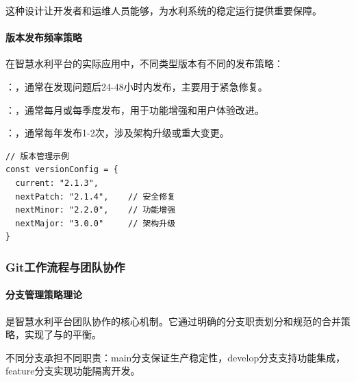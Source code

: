 这种设计让开发者和运维人员能够，为水利系统的稳定运行提供重要保障。

\hypertarget{ux7248ux672cux53d1ux5e03ux9891ux7387ux7b56ux7565}{%
\paragraph{版本发布频率策略}\label{ux7248ux672cux53d1ux5e03ux9891ux7387ux7b56ux7565}}

在智慧水利平台的实际应用中，不同类型版本有不同的发布策略：

：，通常在发现问题后24-48小时内发布，主要用于紧急修复。

：，通常每月或每季度发布，用于功能增强和用户体验改进。

：，通常每年发布1-2次，涉及架构升级或重大变更。

\begin{lstlisting}[style=javascript]
// 版本管理示例
const versionConfig = {
  current: "2.1.3",
  nextPatch: "2.1.4",    // 安全修复
  nextMinor: "2.2.0",    // 功能增强  
  nextMajor: "3.0.0"     // 架构升级
}
\end{lstlisting}

\hypertarget{gitux5de5ux4f5cux6d41ux7a0bux4e0eux56e2ux961fux534fux4f5c}{%
\subsubsection{Git工作流程与团队协作}\label{gitux5de5ux4f5cux6d41ux7a0bux4e0eux56e2ux961fux534fux4f5c}}

\hypertarget{ux5206ux652fux7ba1ux7406ux7b56ux7565ux7406ux8bba}{%
\paragraph{分支管理策略理论}\label{ux5206ux652fux7ba1ux7406ux7b56ux7565ux7406ux8bba}}

是智慧水利平台团队协作的核心机制。它通过明确的分支职责划分和规范的合并策略，实现了与的平衡。



不同分支承担不同职责：main分支保证生产稳定性，develop分支支持功能集成，feature分支实现功能隔离开发。


